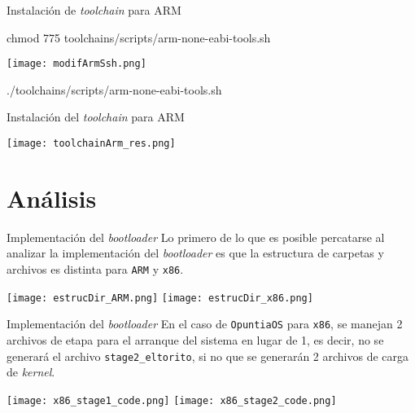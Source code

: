 \begin{frame}{Instalación de \textit{toolchain} para ARM}
	\begin{center}
		\ttfamily
		chmod 775 toolchains/scripts/arm-none-eabi-tools.sh
		
		\enter
		
		\texttt{[image: modifArmSsh.png]}
		
		\enter
		
		./toolchains/scripts/arm-none-eabi-tools.sh
	\end{center}
\end{frame}

\begin{frame}{Instalación del \textit{toolchain} para ARM}
	\begin{center}
		\texttt{[image: toolchainArm\_res.png]}
	\end{center}
\end{frame}




\section{Análisis}
\begin{frame}{}
	
\end{frame}

\begin{frame}{Implementación del \textit{bootloader}}
	Lo primero de lo que es posible percatarse al analizar la implementación del \textit{bootloader} es que la estructura de carpetas y archivos es distinta para \texttt{ARM} y \texttt{x86}.
	\begin{center}
		\texttt{[image: estrucDir\_ARM.png]}
		\hspace{0.5cm}
		\texttt{[image: estrucDir\_x86.png]}
	\end{center}
\end{frame}

\begin{frame}{Implementación del \textit{bootloader}}
	En el caso de \texttt{OpuntiaOS} para \texttt{x86}, se manejan 2 archivos de etapa para el arranque del sistema en lugar de 1, es decir, no se generará el archivo \texttt{stage2\_eltorito}, si no que se generarán 2 archivos de carga de \textit{kernel}.
	\begin{center}
		\texttt{[image: x86\_stage1\_code.png]}
		\hspace{0.5cm}
		\texttt{[image: x86\_stage2\_code.png]}
	\end{center}
\end{frame}

